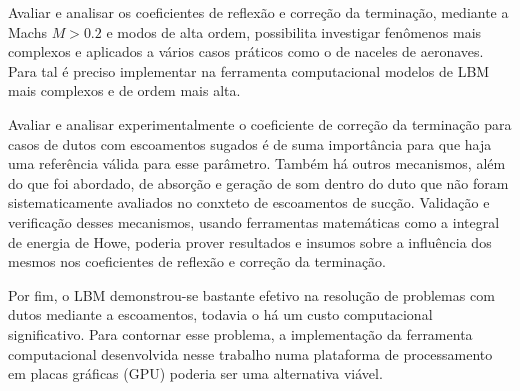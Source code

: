 Avaliar e analisar os coeficientes de reflexão e correção da terminação, mediante a Machs $M > 0.2$ e modos de alta ordem, possibilita investigar fenômenos mais complexos e aplicados a vários casos práticos como o de naceles de aeronaves. Para tal é preciso implementar na ferramenta computacional modelos de LBM mais complexos e de ordem mais alta.

Avaliar e analisar experimentalmente o coeficiente de correção da terminação para casos de dutos com escoamentos sugados é de suma importância para que haja uma referência válida para esse parâmetro. Também há outros mecanismos, além do que foi abordado, de absorção e geração de som dentro do duto que não foram sistematicamente avaliados no conxteto de escoamentos de sucção. Validação e verificação desses mecanismos, usando ferramentas matemáticas como a integral de energia de Howe, poderia prover resultados e insumos sobre a influência dos mesmos nos coeficientes de reflexão e correção da terminação.

Por fim, o LBM demonstrou-se bastante efetivo na resolução de problemas com dutos mediante a escoamentos, todavia o há um custo computacional significativo. Para contornar esse problema, a implementação da ferramenta computacional desenvolvida nesse trabalho numa plataforma de processamento em placas gráficas (GPU) poderia ser uma alternativa viável.   